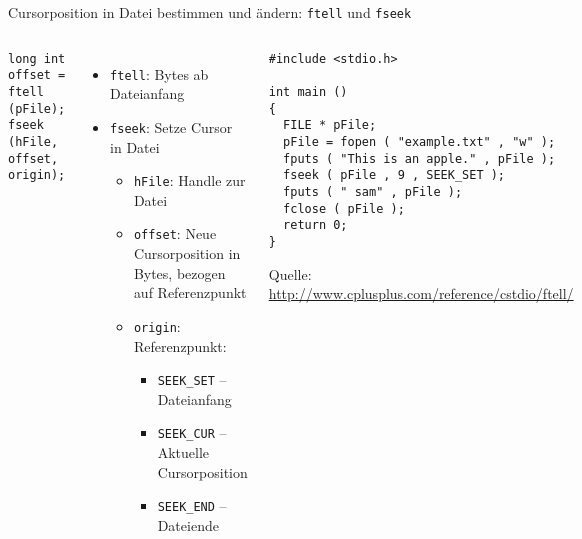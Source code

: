 \begin{frame}[fragile]{Cursorposition in Datei bestimmen und ändern: \texttt{ftell} und \texttt{fseek}}
%
\begin{columns}[T]
\begin{codebox}[Syntax]
\begin{verbatim}
long int offset = ftell (pFile);
fseek (hFile, offset, origin);
\end{verbatim}
\end{codebox}
%
\begin{itemize}
\item \texttt{ftell}: Bytes ab Dateianfang
\item \texttt{fseek}: Setze Cursor in Datei
	\begin{itemize}
	\item \texttt{hFile}: Handle zur Datei
	\item \texttt{offset}: Neue Cursorposition in Bytes, bezogen auf Referenzpunkt
	\item \texttt{origin}: Referenzpunkt:
		\begin{itemize}
		\item \texttt{SEEK\_SET} -- Dateianfang
		\item \texttt{SEEK\_CUR} -- Aktuelle Cursorposition
		\item \texttt{SEEK\_END} -- Dateiende
		\end{itemize}
	\end{itemize}
\end{itemize}
%
\begin{codebox}
\begin{verbatim}
#include <stdio.h>

int main ()
{
  FILE * pFile;
  pFile = fopen ( "example.txt" , "w" );
  fputs ( "This is an apple." , pFile );
  fseek ( pFile , 9 , SEEK_SET );
  fputs ( " sam" , pFile );
  fclose ( pFile );
  return 0;
}
\end{verbatim}
\tiny Quelle:\newline
	\url{http://www.cplusplus.com/reference/cstdio/ftell/}
\end{codebox}
\end{columns}
%
\end{frame}


